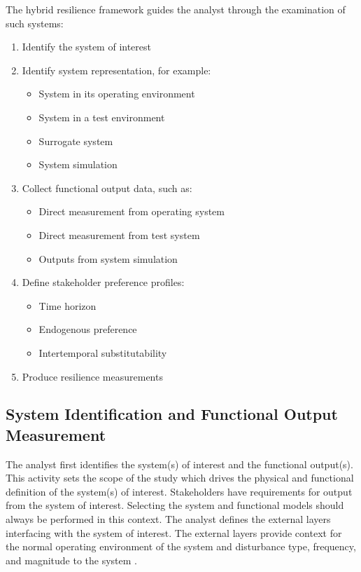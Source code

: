 \documentclass[preprint,12pt]{elsarticle}
\begin{document}
The hybrid resilience framework guides the analyst through the examination of such systems:
\begin{enumerate}
  \item Identify the system of interest
  \item Identify system representation, for example:
    \begin{itemize}
    \item System in its operating environment
    \item System in a test environment
    \item Surrogate system
    \item System simulation
    \end{itemize}
  \item Collect functional output data, such as:
    \begin{itemize}
    \item Direct measurement from operating system
    \item Direct measurement from test system
    \item Outputs from system simulation
    \end{itemize}
  \item Define stakeholder preference profiles:
    \begin{itemize}
    \item Time horizon
    \item Endogenous preference
    \item Intertemporal substitutability
    \end{itemize}
  \item Produce resilience measurements
\end{enumerate}



\subsection{System Identification and Functional Output Measurement}
The analyst first identifies the system(s) of interest and the
functional output(s). This activity sets the scope of the
study which drives the physical and functional definition of the
system(s) of interest. Stakeholders have requirements for output from the
system of interest. Selecting the system and functional models should
always be performed in this context. The analyst defines the external
layers interfacing with the system of interest. The external layers
provide context for the normal operating environment of the system and
disturbance type, frequency, and magnitude to the system \cite{APL2015}.
\end{document}
